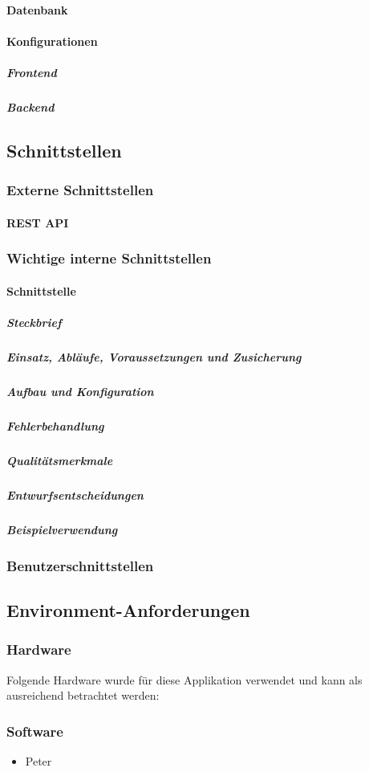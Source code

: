 \paragraph{Datenbank}
\paragraph{Konfigurationen}
\subparagraph{Frontend}

\newpage
\subparagraph{Backend}
\newpage
\subsection{Schnittstellen}

\subsubsection{Externe Schnittstellen}
\paragraph{REST API}

\subsubsection{Wichtige interne Schnittstellen}
\paragraph{Schnittstelle}
\subparagraph{Steckbrief}

\subparagraph{Einsatz, Abläufe, Voraussetzungen und Zusicherung}

\subparagraph{Aufbau und Konfiguration}

\subparagraph{Fehlerbehandlung}

\subparagraph{Qualitätsmerkmale}
\subparagraph{Entwurfsentscheidungen}

\subparagraph{Beispielverwendung}

\subsubsection{Benutzerschnittstellen}

\subsection{Environment-Anforderungen}\label{environmentanforderungen}

\subsubsection{Hardware}
Folgende Hardware wurde für diese Applikation verwendet und kann als ausreichend betrachtet werden:

\subsubsection{Software}

\begin{itemize}
	\item Peter
\end{itemize}
\newpage